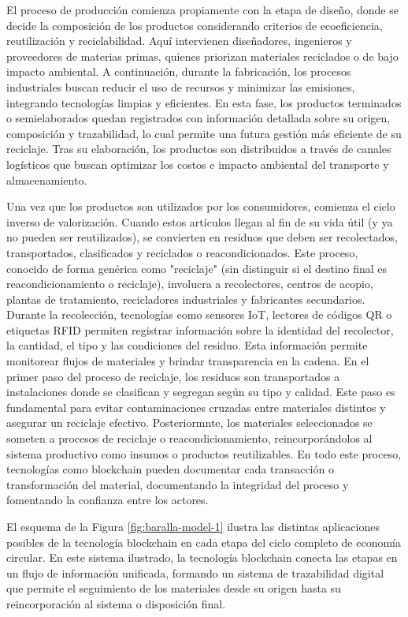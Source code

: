 El proceso de producción comienza propiamente con la etapa de diseño, donde se decide la composición de los productos considerando criterios de ecoeficiencia, reutilización y reciclabilidad. Aquí intervienen diseñadores, ingenieros y proveedores de materias primas, quienes priorizan materiales reciclados o de bajo impacto ambiental. A continuación, durante la fabricación, los procesos industriales buscan reducir el uso de recursos y minimizar las emisiones, integrando tecnologías limpias y eficientes. En esta fase, los productos terminados o semielaborados quedan registrados con información detallada sobre su origen, composición y trazabilidad, lo cual permite una futura gestión más eficiente de su reciclaje. Tras su elaboración, los productos son distribuidos a través de canales logísticos que buscan optimizar los costos e impacto ambiental del transporte y almacenamiento.

Una vez que los productos son utilizados por los consumidores, comienza el ciclo inverso de valorización. Cuando estos artículos llegan al fin de su vida útil (y ya no pueden ser reutilizados), se convierten en residuos que deben ser recolectados, transportados, clasificados y reciclados o reacondicionados. Este proceso, conocido de forma genérica como "reciclaje" (sin distinguir si el destino final es reacondicionamiento o reciclaje), involucra a recolectores, centros de acopio, plantas de tratamiento, recicladores industriales y fabricantes secundarios. Durante la recolección, tecnologías como sensores IoT, lectores de códigos QR o etiquetas RFID permiten registrar información sobre la identidad del recolector, la cantidad, el tipo y las condiciones del residuo. Esta información permite monitorear flujos de materiales y brindar transparencia en la cadena. En el primer paso del proceso de reciclaje, los residuos son transportados a instalaciones donde se clasifican y segregan según su tipo y calidad. Este paso es fundamental para evitar contaminaciones cruzadas entre materiales distintos y asegurar un reciclaje efectivo. Posteriormnte, los materiales seleccionados se someten a procesos de reciclaje o reacondicionamiento, reincorporándolos al sistema productivo como insumos o productos reutilizables. En todo este proceso, tecnologías como blockchain pueden documentar cada transacción o transformación del material, documentando la integridad del proceso y fomentando la confianza entre los actores.

El esquema de la Figura \ref{fig:baralla-model-1} ilustra las distintas aplicaciones posibles de la tecnología blockchain en cada etapa del ciclo completo de economía circular. En este sistema ilustrado, la tecnología blockchain conecta las etapas en un flujo de información unificada, formando un sistema de trazabilidad digital que permite el seguimiento de los materiales desde su origen hasta su reincorporación al sistema o disposición final.

